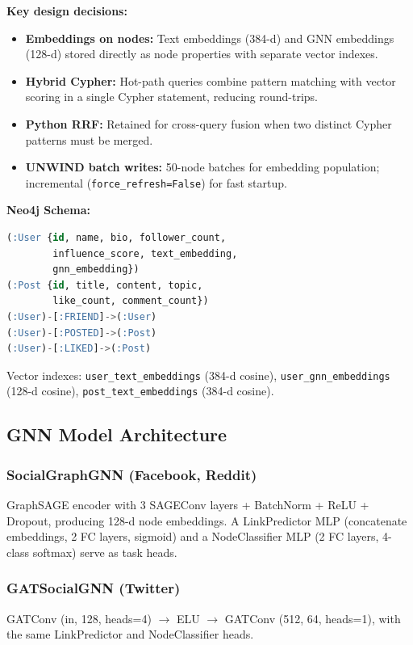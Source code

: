 \documentclass[conference]{IEEEtran}
\begin{document}
\textbf{Key design decisions:}
\begin{itemize}
  \item \textbf{Embeddings on nodes:} Text embeddings (384-d) and GNN embeddings (128-d) stored directly as node properties with separate vector indexes.
  \item \textbf{Hybrid Cypher:} Hot-path queries combine pattern matching with vector scoring in a single Cypher statement, reducing round-trips.
  \item \textbf{Python RRF:} Retained for cross-query fusion when two distinct Cypher patterns must be merged.
  \item \textbf{UNWIND batch writes:} 50-node batches for embedding population; incremental (\texttt{force\_refresh=False}) for fast startup.
\end{itemize}

\textbf{Neo4j Schema:}
\begin{lstlisting}[language=SQL]
(:User {id, name, bio, follower_count,
        influence_score, text_embedding,
        gnn_embedding})
(:Post {id, title, content, topic,
        like_count, comment_count})
(:User)-[:FRIEND]->(:User)
(:User)-[:POSTED]->(:Post)
(:User)-[:LIKED]->(:Post)
\end{lstlisting}

Vector indexes: \texttt{user\_text\_embeddings} (384-d cosine), \texttt{user\_gnn\_embeddings} (128-d cosine), \texttt{post\_text\_embeddings} (384-d cosine).

\subsection{GNN Model Architecture}

\subsubsection{SocialGraphGNN (Facebook, Reddit)}
GraphSAGE encoder with 3 SAGEConv layers + BatchNorm + ReLU + Dropout, producing 128-d node embeddings. A LinkPredictor MLP (concatenate embeddings, 2 FC layers, sigmoid) and a NodeClassifier MLP (2 FC layers, 4-class softmax) serve as task heads.

\subsubsection{GATSocialGNN (Twitter)}
GATConv (in, 128, heads=4) $\rightarrow$ ELU $\rightarrow$ GATConv (512, 64, heads=1), with the same LinkPredictor and NodeClassifier heads.
\end{document}
